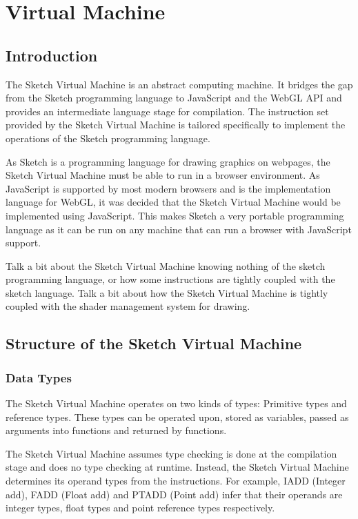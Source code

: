 \documentclass{l3proj}
\begin{document}
\section{Virtual Machine}
\label{arch-abs}

\subsection{Introduction}
The Sketch Virtual Machine is an abstract computing machine. It bridges the gap from the Sketch programming language to JavaScript and the WebGL API and provides an intermediate language stage for compilation. The instruction set provided by the Sketch Virtual Machine is tailored specifically to implement the operations of the Sketch programming language.

As Sketch is a programming language for drawing graphics on webpages, the Sketch Virtual Machine must be able to run in a browser environment. As JavaScript is supported by most modern browsers and is the implementation language for WebGL, it was decided that the Sketch Virtual Machine would be implemented using JavaScript. This makes Sketch a very portable programming language as it can be run on any machine that can run a browser with JavaScript support.

Talk a bit about the Sketch Virtual Machine knowing nothing of the sketch programming language, or how some instructions are tightly coupled with the sketch language.
Talk a bit about how the Sketch Virtual Machine is tightly coupled with the shader management system for drawing.

\subsection{Structure of the Sketch Virtual Machine}

\subsubsection{Data Types}
The Sketch Virtual Machine operates on two kinds of types: Primitive types and reference types. These types can be operated upon, stored as variables, passed as arguments into functions and returned by functions. 

The Sketch Virtual Machine assumes type checking is done at the compilation stage and does no type checking at runtime. Instead, the Sketch Virtual Machine determines its operand types from the instructions. For example, IADD (Integer add), FADD (Float add) and PTADD (Point add) infer that their operands are integer types, float types and point reference types respectively. 
\end{document}
